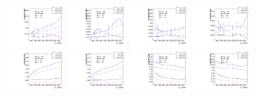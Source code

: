 \begin{figure}[htbp]
  \centering
  \includegraphics[width=0.2\textwidth]{fig/2Dfit/paramSignalYield_VBFSig_mu_HP_bb_LDy.pdf}
  \includegraphics[width=0.2\textwidth]{fig/2Dfit/paramSignalYield_VBFSig_e_HP_bb_LDy.pdf}
  \includegraphics[width=0.2\textwidth]{fig/2Dfit/paramSignalYield_VBFSig_mu_LP_bb_LDy.pdf}
  \includegraphics[width=0.2\textwidth]{fig/2Dfit/paramSignalYield_VBFSig_e_LP_bb_LDy.pdf}\\
  \includegraphics[width=0.2\textwidth]{fig/2Dfit/paramSignalYield_VBFSig_mu_HP_nobb_LDy.pdf}
  \includegraphics[width=0.2\textwidth]{fig/2Dfit/paramSignalYield_VBFSig_e_HP_nobb_LDy.pdf}
  \includegraphics[width=0.2\textwidth]{fig/2Dfit/paramSignalYield_VBFSig_mu_LP_nobb_LDy.pdf}
  \includegraphics[width=0.2\textwidth]{fig/2Dfit/paramSignalYield_VBFSig_e_LP_nobb_LDy.pdf}\\

\end{figure}
